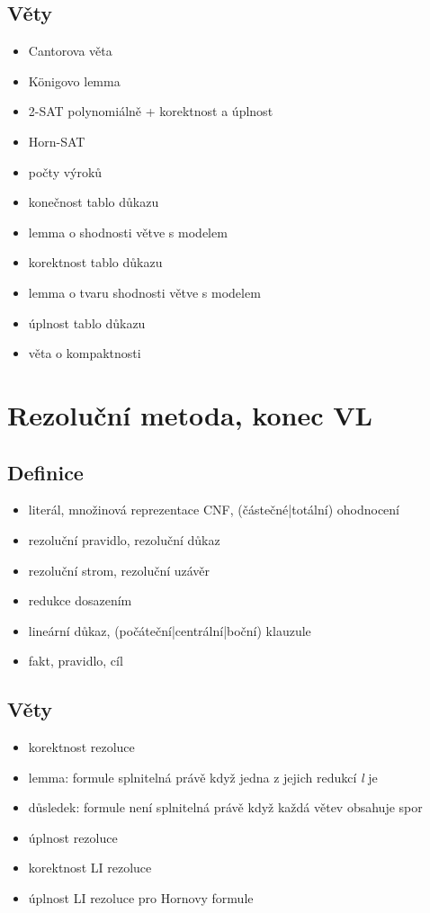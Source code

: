 \documentclass[a4paper]{article}
\begin{document}
\subsection{Věty}
\begin{itemize}
\item Cantorova věta
\item Königovo lemma
\item 2-SAT polynomiálně + korektnost a úplnost
\item Horn-SAT
\item počty výroků
\item konečnost tablo důkazu
\item lemma o shodnosti větve s modelem
\item korektnost tablo důkazu
\item lemma o tvaru shodnosti větve s modelem 
\item úplnost tablo důkazu
\item věta o kompaktnosti
\end{itemize}

\pagebreak

\section{Rezoluční metoda, konec VL}

\subsection{Definice}
\begin{itemize}
\item literál, množinová reprezentace CNF, (částečné|totální) ohodnocení
\item rezoluční pravidlo, rezoluční důkaz
\item rezoluční strom, rezoluční uzávěr
\item redukce dosazením
\item lineární důkaz, (počáteční|centrální|boční) klauzule
\item fakt, pravidlo, cíl
\end{itemize}

\subsection{Věty}
\begin{itemize}
\item korektnost rezoluce
\item lemma: formule splnitelná právě když jedna z jejich redukcí \textit{l} je
\item důsledek: formule není splnitelná právě když každá větev obsahuje spor
\item úplnost rezoluce
\item korektnost LI rezoluce
\item úplnost LI rezoluce pro Hornovy formule
\end{itemize}
\end{document}
